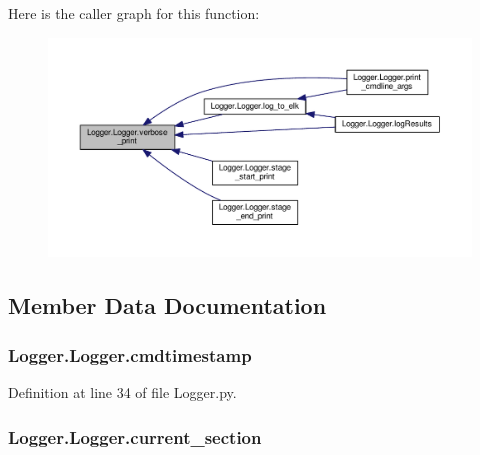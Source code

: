 Here is the caller graph for this function\-:
\nopagebreak
\begin{figure}[H]
\begin{center}
\leavevmode
\includegraphics[width=350pt]{class_logger_1_1_logger_a8c05e25fb36679fae21ab8910eb6d117_icgraph}
\end{center}
\end{figure}




\subsection{Member Data Documentation}
\hypertarget{class_logger_1_1_logger_a6424ebff90f965d7c6e4e8d7303bc3e2}{
\subsubsection[{cmdtimestamp}]{\setlength{\rightskip}{0pt plus 5cm}Logger.\-Logger.\-cmdtimestamp}}\label{class_logger_1_1_logger_a6424ebff90f965d7c6e4e8d7303bc3e2}


Definition at line 34 of file Logger.\-py.

\hypertarget{class_logger_1_1_logger_a6cfd93e86a2b313df761184fa0661e0a}{
\subsubsection[{current\-\_\-section}]{\setlength{\rightskip}{0pt plus 5cm}Logger.\-Logger.\-current\-\_\-section}}\label{class_logger_1_1_logger_a6cfd93e86a2b313df761184fa0661e0a}


